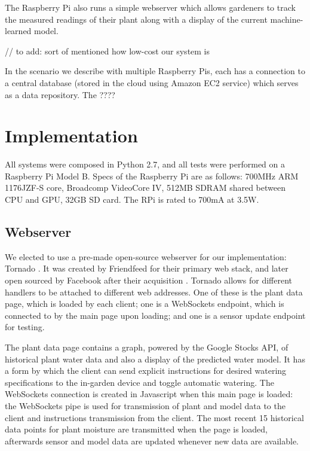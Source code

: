 \documentclass[a4paper]{acm_proc_article-sp}
\begin{document}
The Raspberry Pi also runs a simple webserver which allows gardeners to track the measured readings of their plant along with a display of the current machine-learned model.

// to add: sort of mentioned how low-cost our system is

In the scenario we describe with multiple Raspberry Pis, each has a connection to a central database (stored in the cloud using Amazon EC2 service) which serves as a data repository.  The ????

\section{Implementation}

All systems were composed in Python 2.7, and all tests were performed on a Raspberry Pi Model B.  Specs of the Raspberry Pi are as follows: 700MHz ARM 1176JZF-S core, Broadcomp VideoCore IV, 512MB SDRAM shared between CPU and GPU, 32GB SD card.  The RPi is rated to 700mA at 3.5W.

\subsection{Webserver}

We elected to use a pre-made open-source webserver for our implementation: Tornado \cite{}.  It was created by Friendfeed for their primary web stack, and later open sourced by Facebook after their acquisition \cite{}.  Tornado allows for different handlers to be attached to different web addresses.  One of these is the plant data page, which is loaded by each client; one is a WebSockets endpoint, which is connected to by the main page upon loading; and one is a sensor update endpoint for testing.

The plant data page contains a graph, powered by the Google Stocks API, of historical plant water data and also a display of the predicted water model.  It has a form by which the client can send explicit instructions for desired watering specifications to the in-garden device and toggle automatic watering.  The WebSockets connection is created in Javascript when this main page is loaded: the WebSockets pipe is used for transmission of plant and model data to the client and instructions transmission from the client.  The most recent 15 historical data points for plant moisture are transmitted when the page is loaded, afterwards sensor and model data are updated whenever new data are available.
\end{document}
